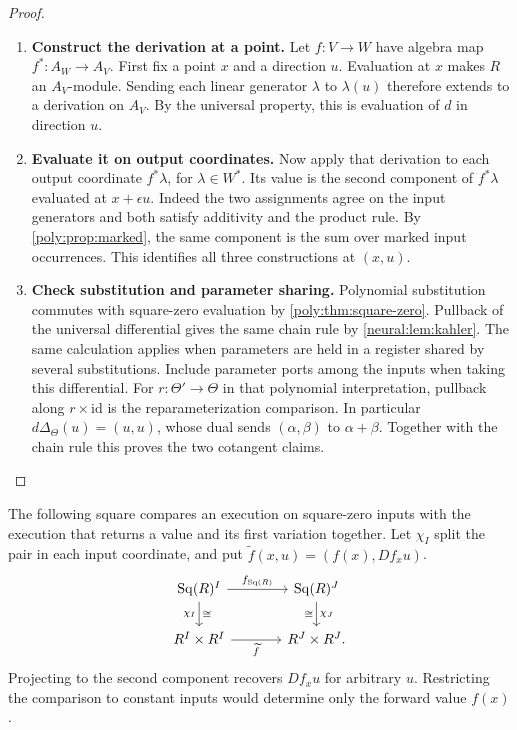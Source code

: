 \documentclass[11pt,a4paper]{article}
\theoremstyle{definition}
\theoremstyle{remark}\newaliascnt{remark}{theorem}
\newcommand{\id}{\mathrm{id}}
\numberwithin{equation}{section}
\begin{document}
\begin{proof}\leavevmode
\begin{enumerate}[titledsteps]
    \item \textbf{Construct the derivation at a point.} Let $f:V\to W$ have algebra map $f^*:A_W\to A_V$. First fix a point $x$ and a direction $u$. Evaluation at $x$ makes $R$ an $A_V$-module. Sending each linear generator $\lambda$ to $\lambda(u)$ therefore extends to a derivation on $A_V$. By the universal property, this is evaluation of $d$ in direction $u$.


    \item \textbf{Evaluate it on output coordinates.} Now apply that derivation to each output coordinate $f^*\lambda$, for $\lambda\in W^*$. Its value is the second component of $f^*\lambda$ evaluated at $x+\epsilon u$. Indeed the two assignments agree on the input generators and both satisfy additivity and the product rule. By \cref{poly:prop:marked}, the same component is the sum over marked input occurrences. This identifies all three constructions at $(x,u)$.


    \item \textbf{Check substitution and parameter sharing.} Polynomial substitution commutes with square-zero evaluation by
\cref{poly:thm:square-zero}. Pullback of the universal differential gives the
same chain rule by \cref{neural:lem:kahler}. The same calculation applies when parameters are held in a register shared by several substitutions. Include
parameter ports among the inputs when taking this differential.
For $r:\Theta'\to\Theta$ in that polynomial interpretation, pullback
along $r\times\id$ is the reparameterization comparison. In
particular $d\Delta_\Theta(u)=(u,u)$, whose dual sends
$(\alpha,\beta)$ to $\alpha+\beta$. Together with the chain rule this proves the two cotangent claims.\qedhere
\end{enumerate}
\end{proof}
The following square compares an execution on square-zero inputs with the execution that returns a value and its first variation together. Let $\chi_I$ split the pair in each input coordinate, and put $\widetilde f(x,u)=(f(x),Df_xu)$.
\[
\begin{tikzcd}[column sep=large]
 \operatorname{Sq}(R)^I \arrow[r,"f_{\operatorname{Sq}(R)}"]
    \arrow[d,"\chi_I"',"\cong"] &
 \operatorname{Sq}(R)^J \arrow[d,"\chi_J","\cong"']\\
 R^I\times R^I \arrow[r,"\widetilde f"'] &
 R^J\times R^J .
\end{tikzcd}
\]
Projecting to the second component recovers $Df_xu$ for arbitrary $u$. Restricting the comparison to constant inputs would determine only the forward value $f(x)$.
\end{document}
